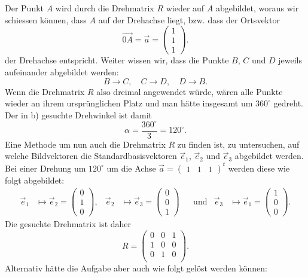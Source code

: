 \begin{loesung}
\begin{teilaufgaben}
\item 
Der Punkt $A$ wird durch die Drehmatrix $R$ wieder auf $A$ abgebildet, woraus 
wir schiessen können, dass $A$ auf der Drehachse liegt, bzw. dass der 
Ortsvektor
\[
  \overrightarrow{0A}  = \vec{a}= \begin{pmatrix}1\\1\\1\end{pmatrix}.
\]
der Drehachse entspricht. Weiter wissen wir, dass die Punkte $B$, $C$ und $D$
jeweils aufeinander abgebildet werden:
\[
  B \rightarrow C,\quad
  C \rightarrow D,\quad
  D \rightarrow B.
\]
Wenn die Drehmatrix $R$ also dreimal angewendet würde, wären alle Punkte
wieder an ihrem ursprünglichen Platz und man hätte insgesamt um $360^\circ$ gedreht.
Der in b) gesuchte Drehwinkel ist damit
\[
  \alpha = \dfrac{360^\circ}{3} = 120^\circ.
\]
Eine Methode um nun auch die Drehmatrix $R$ zu finden ist, zu untersuchen,
auf welche Bildvektoren die Standardbasisvektoren $\vec e_1$, $\vec e_2$ und $\vec e_3$
abgebildet werden. 
Bei einer Drehung um $120^\circ$ um die Achse $\vec a = \begin{pmatrix}1&1&1\end{pmatrix}^t$
werden diese wie folgt abgebildet:
\[
\begin{aligned}
\vec e_1&\mapsto \vec e_2 = \begin{pmatrix}0\\1\\0\end{pmatrix},
&
\vec e_2&\mapsto \vec e_3 = \begin{pmatrix}0\\0\\1\end{pmatrix}
&&\text{und}
&
\vec e_3&\mapsto \vec e_1 = \begin{pmatrix}1\\0\\0\end{pmatrix}.
\end{aligned}
\]
Die gesuchte Drehmatrix ist daher
\[
R
=
\begin{pmatrix}
0&0& 1\\
1&0& 0\\
0&1& 0\\
\end{pmatrix}.
\]
Alternativ hätte die Aufgabe aber auch wie folgt gelöst werden können:\\

\end{teilaufgaben}
\end{loesung}
